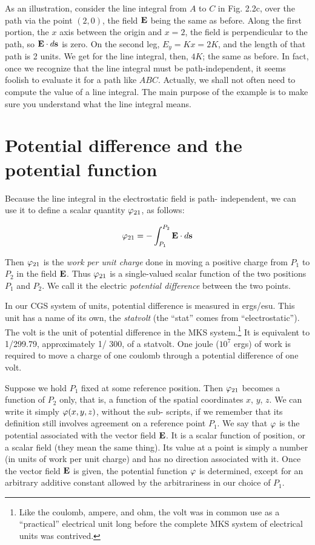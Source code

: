 As an illustration, consider the line integral from $A$ to $C$ in Fig. 2.2c,
over the path via the point $(2,0)$, the field $\mathbf{E}$ being the same as before.
Along the first portion, the $x$ axis between the origin and $x = 2$, the
field is perpendicular to the path, so $\mathbf{E}\cdot d\mathbf{s}$ is zero. On the second leg,
$E_y = Kx = 2K$, and the length of that path is 2 units. We get for the
line integral, then, $4K$; the same as before. In fact, once we recognize
that the line integral must be path-independent, it seems foolish to
evaluate it for a path like $ABC$. Actually, we shall not often need to
compute the value of a line integral. The main purpose of the example
is to make sure you understand what the line integral means.

\section{Potential difference and the potential function}
Because the line integral in the electrostatic field is path-
independent, we can use it to define a scalar quantity $\varphi_{21}$, as follows:
\begin{framed}
\begin{equation}
  \varphi_{21} = -\int_{P_1}^{P_2} \mathbf{E}\cdot d\mathbf{s}
\end{equation}
\end{framed}
Then $\varphi_{21}$ is the \emph{work per unit charge} done in moving a positive
charge from $P_1$ to $P_2$ in the field $\mathbf{E}$. Thus $\varphi_{21}$ is a single-valued scalar
function of the two positions $P_1$ and $P_2$. We call it the electric
\emph{potential difference} between the two points.

In our CGS system of units, potential difference is measured in
ergs/esu. This unit has a name of its own, the \emph{statvolt} (the ``stat''
comes from ``electrostatic''). The volt is the unit of potential difference
in the MKS system.\footnote{Like the coulomb, ampere, and
ohm, the volt was in common use as a ``practical''
electrical unit long before the complete MKS system of electrical units was contrived.}
It is equivalent to 1/299.79, approximately
1/ 300, of a statvolt. One joule ($10^7$ ergs) of work is required
to move a charge of one coulomb through a potential difference of
one volt.

Suppose we hold $P_1$ fixed at some reference position. Then $\varphi_{21}$
becomes a function of $P_2$ only, that is, a function of the spatial coordinates
$x$, $y$, $z$. We can write it simply $\varphi(x,y,z)$, without the sub-
scripts, if we remember that its definition still involves agreement
on a reference point $P_1$. We say that $\varphi$ is the potential associated with
the vector field $\mathbf{E}$. It is a scalar function of position, or a scalar field
(they mean the same thing). Its value at a point is simply a number
(in units of work per unit charge) and has no direction associated
with it. Once the vector field $\mathbf{E}$ is given, the potential function $\varphi$
is determined, except for an arbitrary additive constant allowed by
the arbitrariness in our choice of $P_1$.

